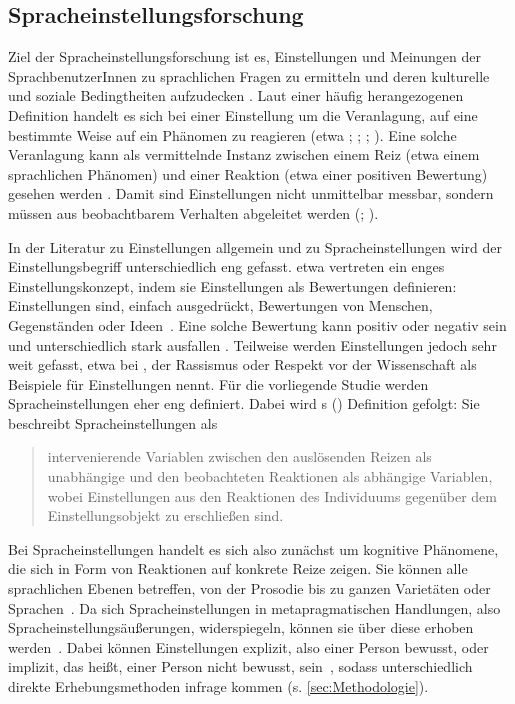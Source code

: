\subsection{Spracheinstellungsforschung}
\label{sec:Spracheinstellungsforschung}
Ziel der Spracheinstellungsforschung ist es, \glqq Einstellungen und Meinungen der SprachbenutzerInnen zu sprachlichen Fragen zu ermitteln und deren kulturelle und soziale Bedingtheiten aufzudecken\grqq{} \citep[179]{Plewnia.2011}.
Laut einer häufig herangezogenen Definition handelt es sich bei einer Einstellung um die Veranlagung, auf eine bestimmte Weise auf ein Phänomen zu reagieren (etwa \citealp[805]{Allport.1935}; \citealp[69]{Hermanns.2002};  \citealp[116]{Garrett.2007}; \citealp[63]{Adler.2018}).
Eine solche Veranlagung kann als vermittelnde Instanz zwischen einem Reiz (etwa einem sprachlichen Phänomen) und einer Reaktion (etwa einer positiven Bewertung) gesehen werden \citep[s.][1319]{Vandermeeren2005}. 
Damit sind Einstellungen nicht unmittelbar messbar, sondern müssen aus beobachtbarem Verhalten abgeleitet werden (\citealp[s.][242, 245]{Ajzen1989}; \citealp[1319]{Vandermeeren2005}). 

In der Literatur zu Einstellungen allgemein und zu Spracheinstellungen wird der Einstellungsbegriff unterschiedlich eng gefasst.
\citet{Aronson.2014} etwa vertreten ein enges Einstellungskonzept, indem sie Einstellungen als Bewertungen definieren: {\glqq}Einstellungen sind, einfach ausgedr{\"u}ckt, Bewertungen von Menschen, Gegenst{\"a}nden oder Ideen{\grqq}~\citep[218]{Aronson.2014}. 
Eine solche Bewertung kann positiv oder negativ sein und unterschiedlich stark ausfallen \citep[s.][199]{Jonas.2014}. 
Teilweise werden Einstellungen jedoch sehr weit gefasst, etwa bei \citet[802]{Allport.1935}, der Rassismus oder Respekt vor der Wissenschaft als Beispiele f{\"u}r Einstellungen nennt. 
Für die vorliegende Studie werden Spracheinstellungen eher eng definiert. 
Dabei wird \citeauthor{Neuland.1993}s (\citeyear{Neuland.1993}) Definition gefolgt: Sie beschreibt Spracheinstellungen als
\begin{quote}intervenierende Variablen zwischen den ausl{\"o}senden Reizen als unabh{\"a}ngige und den beobachteten Reaktionen als abh{\"a}ngige Variablen, wobei Einstellungen aus den Reaktionen des Individuums gegen{\"u}ber dem Einstellungsobjekt zu erschlie{\ss}en sind.~\citep[728]{Neuland.1993}\end{quote}
Bei Spracheinstellungen handelt es sich also zunächst um kognitive Phänomene, die sich in Form von Reaktionen auf konkrete Reize zeigen. 
Sie k{\"o}nnen alle sprachlichen Ebenen betreffen, von der Prosodie bis zu ganzen Variet{\"a}ten oder Sprachen~\citep[s.][2]{Garrett.2012}. 
Da sich Spracheinstellungen in metapragmatischen Handlungen, %
also Spracheinstellungsäußerungen, %
widerspiegeln, können sie über diese erhoben werden~\citep[s.][1319]{Vandermeeren2005}. 
Dabei können Einstellungen explizit, also einer Person bewusst, oder implizit, das heißt, einer Person nicht bewusst, sein~\citep[s.][222]{Aronson.2014}, sodass unterschiedlich direkte Erhebungsmethoden infrage kommen (s. \autoref{sec:Methodologie}). 
